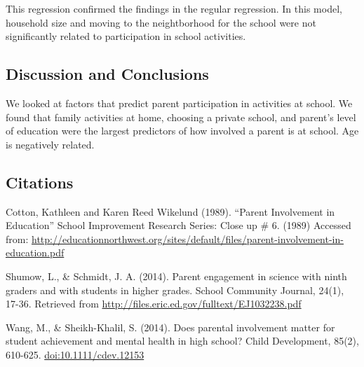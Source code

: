 \documentclass[
  12pt,
]{article}
\begin{document}
This regression confirmed the findings in the regular regression. In
this model, household size and moving to the neightborhood for the
school were not significantly related to participation in school
activities.

\hypertarget{discussion-and-conclusions}{%
\subsection{\texorpdfstring{\textbf{Discussion and
Conclusions}}{Discussion and Conclusions}}\label{discussion-and-conclusions}}

We looked at factors that predict parent participation in activities at
school. We found that family activities at home, choosing a private
school, and parent's level of education were the largest predictors of
how involved a parent is at school. Age is negatively related.

\hypertarget{citations}{%
\subsection{\texorpdfstring{\textbf{Citations}}{Citations}}\label{citations}}

Cotton, Kathleen and Karen Reed Wikelund (1989). ``Parent Involvement in
Education'' School Improvement Research Series: Close up \# 6. (1989)
Accessed from:
\url{http://educationnorthwest.org/sites/default/files/parent-involvement-in-education.pdf}

Shumow, L., \& Schmidt, J. A. (2014). Parent engagement in science with
ninth graders and with students in higher grades. School Community
Journal, 24(1), 17-36. Retrieved from
\url{http://files.eric.ed.gov/fulltext/EJ1032238.pdf}

Wang, M., \& Sheikh-Khalil, S. (2014). Does parental involvement matter
for student achievement and mental health in high school? Child
Development, 85(2), 610-625. \url{doi:10.1111/cdev.12153}
\end{document}
